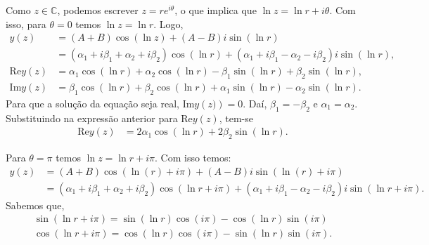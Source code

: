 \documentclass[a4paper,12pt, leqno, answers]{exam}
\begin{document}
\begin{questions}
\begin{solution}
        Como $z \in \mathbb{C}$, podemos escrever $z = r e^{i \theta}$, o que implica que $\ln z = \ln r + i \theta$. Com isso, para $\theta = 0$ temos $\ln z = \ln r$. Logo,
        \begin{align*}
            y(z) &= \left( A + B \right) \cos\left( \ln z \right) + \left( A - B \right) i \sin \left( \ln r \right) \\
            &= \left( \alpha_1 + i \beta_1 + \alpha_2 + i\beta_2 \right) \cos \left( \ln r \right) + \left( \alpha_1 + i \beta_1 - \alpha_2 - i\beta_2 \right) i \sin\left( \ln r \right), \\
            \text{Re} y\left( z \right) &= \alpha_1 \cos\left( \ln r \right) + \alpha_2 \cos\left( \ln r \right) - \beta_1 \sin\left( \ln r \right) + \beta_2 \sin\left( \ln r \right), \\
            \text{Im} y\left( z \right) &= \beta_1 \cos\left( \ln r \right) + \beta_2 \cos\left( \ln r \right) + \alpha_1 \sin\left( \ln r \right) - \alpha_2 \sin\left( \ln r \right).
        \end{align*}
        Para que a solu\c{c}\~{a}o da equa\c{c}\~{a}o seja real, $\text{Im} y\left( z) \right) = 0$. Da\'{i}, $\beta_1 = -\beta_2$ e $\alpha_1 = \alpha_2$. Substituindo na express\~{a}o anterior para $\text{Re} y\left( z \right)$, tem-se
        \begin{align*}
            \text{Re} y\left( z \right) &= 2\alpha_1 \cos\left( \ln r \right) + 2 \beta_2 \sin\left( \ln r \right).
        \end{align*}

        Para $\theta = \pi$ temos $\ln z = \ln r + i \pi$. Com isso temos:
        \begin{align*}
            y\left( z \right) &= \left( A + B \right) \cos\left( \ln\left( r \right) + i \pi\right) + \left( A - B \right) i \sin\left( \ln\left( r \right) +i \pi\right) \\
            & = \left( \alpha_1 + i \beta_1 + \alpha_2 + i\beta_2 \right) \cos \left( \ln r + i \pi \right) + \left( \alpha_1 + i \beta_1 - \alpha_2 - i\beta_2 \right) i \sin\left( \ln r + i \pi \right).
        \end{align*}
        Sabemos que,
        \begin{align*}
            \sin\left(\ln r + i \pi\right) = \sin\left(\ln r\right) \cos\left(i \pi\right) - \cos\left(\ln r\right) \sin\left(i \pi\right)\\
            \cos\left(\ln r + i \pi\right) = \cos\left(\ln r\right) \cos\left(i \pi\right) - \sin\left(\ln r\right) \sin\left(i \pi\right).
        \end{align*}


\end{solution}
\end{questions}
\end{document}
